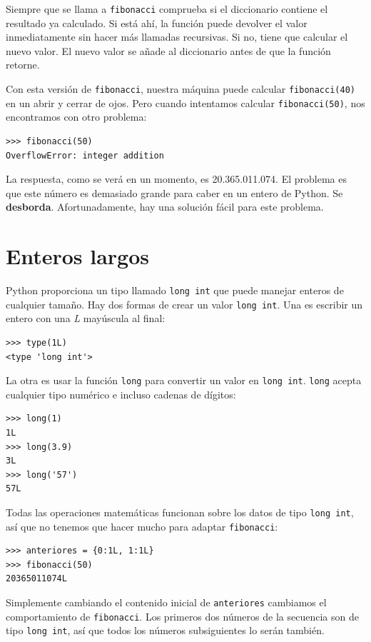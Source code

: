 Siempre que se llama a \texttt{fibonacci} comprueba si el diccionario
contiene el resultado ya calculado. Si está ahí, la función puede
devolver el valor inmediatamente sin hacer más llamadas recursivas.
Si no, tiene que calcular el nuevo valor. El nuevo valor se añade
al diccionario antes de que la función retorne.

Con esta versión de \texttt{fibonacci}, nuestra máquina puede calcular
\texttt{fibonacci(40)} en un abrir y cerrar de ojos. Pero cuando intentamos
calcular \texttt{fibonacci(50)}, nos encontramos con otro problema:

 

\begin{lstlisting}
>>> fibonacci(50)
OverflowError: integer addition
\end{lstlisting}
La respuesta, como se verá en un momento, es 20.365.011.074. El problema
es que este número es demasiado grande para caber en un entero de
Python. Se \textbf{desborda}. Afortunadamente, hay una solución fácil
para este problema.

\section{Enteros largos}

  

Python proporciona un tipo llamado \texttt{long int} que puede manejar
enteros de cualquier tamaño. Hay dos formas de crear un valor \texttt{long
int}. Una es escribir un entero con una {\em L} mayúscula al final:

\begin{lstlisting}
>>> type(1L)
<type 'long int'>
\end{lstlisting}
 La otra es usar la función \texttt{long} para convertir un valor
en \texttt{long int}. \texttt{long} acepta cualquier tipo numérico
e incluso cadenas de dígitos:
\begin{lstlisting}
>>> long(1)
1L
>>> long(3.9)
3L
>>> long('57')
57L
\end{lstlisting}
Todas las operaciones matemáticas funcionan sobre los datos de tipo
\texttt{long int}, así que no tenemos que hacer mucho para adaptar
\texttt{fibonacci}:
\begin{lstlisting}
>>> anteriores = {0:1L, 1:1L}
>>> fibonacci(50)
20365011074L
\end{lstlisting}
Simplemente cambiando el contenido inicial de \texttt{anteriores}
cambiamos el comportamiento de \texttt{fibonacci}. Los primeros dos
números de la secuencia son de tipo \texttt{long int}, así que todos
los números subsiguientes lo serán también.

